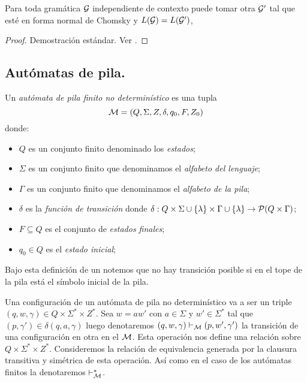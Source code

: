 \documentclass[tesis.tex]{subfiles}
\begin{document}
\begin{prop}
	Para toda gramática $\cal G$ independiente de contexto puede tomar otra $\cal G'$ tal que esté en forma normal de Chomsky y $L({\cal G}) = L(\cal G')$,
\end{prop}

\begin{proof}
	Demostración estándar. Ver \cite{hopcraft-ullman}.
\end{proof}

\subsection{Autómatas de pila.}

\begin{deff}
	Un \emph{autómata de pila finito no determinístico} es una tupla 
	\[
	{\cal M } = (Q, \Sigma, Z, \delta, q_0, F, Z_0)
	\]
	donde:
	\begin{itemize}
		\item $Q$ es un conjunto finito denominado los \emph{estados};
		\item $\Sigma$ es un conjunto finito que denominamos el \emph{alfabeto del lenguaje};
		\item $\Gamma$ es un conjunto finito que denominamos el \emph{alfabeto de la pila};
		\item $\delta$ es la \emph{función de transición} donde $\delta: Q  \times \Sigma \cup \{ \lambda \} \times \Gamma \cup \{ \lambda \} \to {\cal P}( Q  \times \Gamma)$;
		\item $F \subseteq Q$ es el conjunto de \emph{estados finales};
		\item $q_0 \in Q$ es el \emph{estado inicial};
	\end{itemize}
\end{deff}

\begin{obs}
	Bajo esta definición de un \APND notemos que no hay transición posible si en el tope de la pila está el símbolo inicial de la pila. 
\end{obs}


Una configuración de un autómata de pila no determinístico va a ser un triple $(q,w,\gamma) \in Q \times \Sigma^* \times Z^*$.
Sea $w = aw'$ con $a \in \Sigma$ y $w' \in \Sigma^*$ tal que $(p,\gamma') \in \delta (q,a,\gamma)$ luego denotaremos $(q,w,\gamma) \vdash_{\cal M} (p,w',\gamma')$ la transición de una configuración en otra en el \APND $\cal M$.
Esta operación nos define una relación sobre $Q \times \Sigma^* \times Z^*$.
Consideremos la relación de equivalencia generada por la clausura transitiva y simétrica de esta operación.
Así como en el caso de los autómatas finitos la denotaremos $\vdash^*_{\cal M}$.
\end{document}
